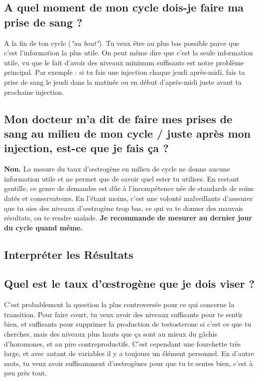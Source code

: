 \documentclass{article}
\begin{document}
\subsection{A quel moment de mon cycle dois-je faire ma prise de sang ?}

A la fin de ton cycle (\textit{"au bout"}). Tu veux être au plus bas possible parce que c'est l'information la plus utile. On peut même dire que c'est la seule information utile, vu que le fait d'avoir des niveaux minimum suffisants est notre problème principal. Par exemple : si tu fais une injection chaque jeudi après-midi, fais ta prise de sang le jeudi dans la matinée ou en début d'après-midi juste avant ta prochaine injection.

\subsection{Mon docteur m'a dit de faire mes prises de sang au milieu de mon cycle / juste après mon injection, est-ce que je fais ça ?}

\textbf{Non.} La mesure du taux d'œstrogène en milieu de cycle ne donne aucune information utile et ne permet que de savoir quel ester tu utilises. En restant gentille, ce genre de demandes est dûe à l'incompétence née de standards de soins datés et conservateurs. En l'étant moins, c'est une volonté malveillante d'asssurer que tu aies des niveaux d'œstrogène trop bas, ce qui va te donner des mauvais résultats, ou te rendre malade. \textbf{Je recommande de mesurer au dernier jour du cycle quand même.} 

\subsection*{Interpréter les Résultats}

\subsection{Quel est le taux d'œstrogène que je dois viser ?}

C'est probablement la question la plus controversée pour ce qui concerne la transition. Pour faire court, tu veux avoir des niveaux suffisants pour te sentir bien, et suffisants pour supprimer la production de testosterone si c'est ce que tu cherches, mais des niveaux plus hauts que ça sont au mieux du gâchis d'horomones, et au pire contreproductifs. C'est cependant une fourchette très large, et avec autant de variables il y a toujours un élément personnel. En d'autre mots, tu veux avoir suffisamment d'œstrogènes pour que tu te sentes bien, c'est à peu près tout.
\end{document}
